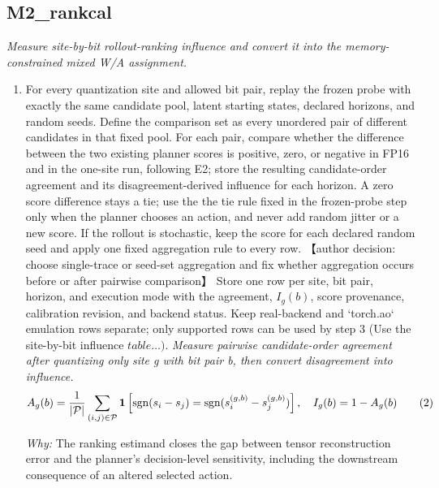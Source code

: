 \documentclass[10pt,a4paper]{article}
\begin{document}
\subsection*{M2\_rankcal}
\emph{Measure site-by-bit rollout-ranking influence and convert it into the memory-constrained mixed W/A assignment.}
\begin{enumerate}[leftmargin=*,start=2]
  \item For every quantization site and allowed bit pair, replay the frozen probe with exactly the same candidate pool, latent starting states, declared horizons, and random seeds. Define the comparison set as every unordered pair of different candidates in that fixed pool. For each pair, compare whether the difference between the two existing planner scores is positive, zero, or negative in FP16 and in the one-site run, following E2;\allowbreak{} store the resulting candidate-order agreement and its disagreement-derived influence for each horizon. A zero score difference stays a tie;\allowbreak{} use the the tie rule fixed in the frozen-probe step only when the planner chooses an action, and never add random jitter or a new score. If the rollout is stochastic, keep the score for each declared random seed and apply one fixed aggregation rule to every row. 【author decision: choose single-trace or seed-set aggregation and fix whether aggregation occurs before or after pairwise comparison】 Store one row per site, bit pair, horizon, and execution mode with the agreement, \(I_{g}(b)\), score provenance, calibration revision, and backend status. Keep real-backend and `torch.ao` emulation rows separate;\allowbreak{} only supported rows can be used by step 3 (Use the site-by-bit influence \(table\dots )\).
\noindent\emph{Measure pairwise candidate-order agreement after quantizing only site g with bit pair b, then convert disagreement into influence.}
\begin{equation}
\resizebox{\ifdim\width>\linewidth \linewidth\else\width\fi}{!}{$\displaystyle A_g(b)=\frac{1}{|\mathcal{P}|}\sum_{(i,j)\in\mathcal{P}}\mathbf{1}\left[\operatorname{sgn}(s_i-s_j)=\operatorname{sgn}(s_i^{(g,b)}-s_j^{(g,b)})\right],\quad I_g(b)=1-A_g(b)$} \tag{2}
\end{equation}
\par\emph{Why:} The ranking estimand closes the gap between tensor reconstruction error and the planner's decision-level sensitivity, including the downstream consequence of an altered selected action.

\end{enumerate}
\end{document}
